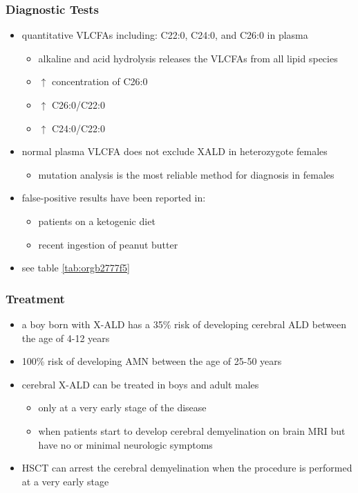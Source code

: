 \documentclass[12pt]{scrartcl}
\begin{document}
\subsubsection{Diagnostic Tests}
\label{sec:orgfcd4245}
\begin{itemize}
\item quantitative VLCFAs including: C22:0, C24:0, and C26:0 in plasma
\begin{itemize}
\item alkaline and acid hydrolysis releases the VLCFAs from all lipid
species
\item \(\uparrow\) concentration of C26:0
\item \(\uparrow\) C26:0/C22:0
\item \(\uparrow\) C24:0/C22:0
\end{itemize}

\item normal plasma VLCFA does not exclude XALD in heterozygote females
\begin{itemize}
\item mutation analysis is the most reliable method for diagnosis in females
\end{itemize}

\item false-positive results have been reported in:
\begin{itemize}
\item patients on a ketogenic diet
\item recent ingestion of peanut butter
\end{itemize}
\item see table \ref{tab:orgb2777f5}
\end{itemize}
\subsubsection{Treatment}
\label{sec:org17eb932}
\begin{itemize}
\item a boy born with X-ALD has a 35\% risk of developing cerebral ALD
between the age of 4-12 years
\item 100\% risk of developing AMN between the age of 25-50 years
\item cerebral X-ALD can be treated in boys and adult males
\begin{itemize}
\item only at a very early stage of the disease
\item when patients start to develop cerebral demyelination on brain MRI
but have no or minimal neurologic symptoms
\end{itemize}
\item HSCT can arrest the cerebral demyelination when the procedure is
performed at a very early stage
\end{itemize}
\end{document}
